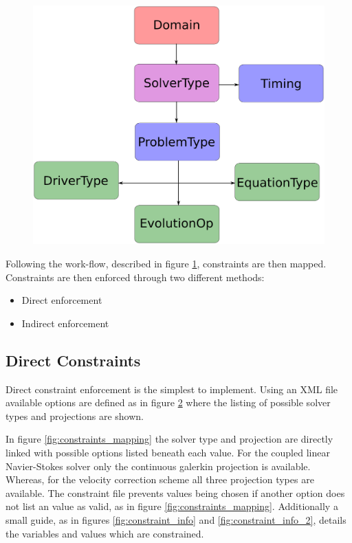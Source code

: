 \documentclass[11pt, a4paper]{report}
\begin{document}
\begin{figure}[htb!]
 \centering
 \includegraphics[width=.5\linewidth,  clip=true, trim = 0cm 0cm 0cm 0cm]{decision_flow}
 \label{fig:descision_flow}
\end{figure}

Following the work-flow, described in figure \ref{fig:descision_flow}, constraints are then mapped. Constraints are then enforced through two different methods:
\begin{itemize}
\item Direct enforcement
\item Indirect enforcement
\end{itemize}

\subsection{Direct Constraints}
Direct constraint enforcement is the simplest to implement. Using an XML file available options are defined as in figure \ref{fig:constraints_variables} where the listing of possible solver types and projections are shown.

\begin{figure}[htb!]
 \centering
 
 \label{fig:constraints_variables}
\end{figure}

In figure \ref{fig:constraints_mapping} the solver type and projection are directly linked with possible options listed beneath each value. For the coupled linear Navier-Stokes solver only the continuous galerkin projection is available. Whereas, for the velocity correction scheme all three projection types are available. The constraint file prevents values being chosen if another option does not list an value as valid, as in figure \ref{fig:constraints_mapping}. Additionally a small guide, as in figures \ref{fig:constraint_info} and \ref{fig:constraint_info_2}, details the variables and values which are constrained.
\end{document}
